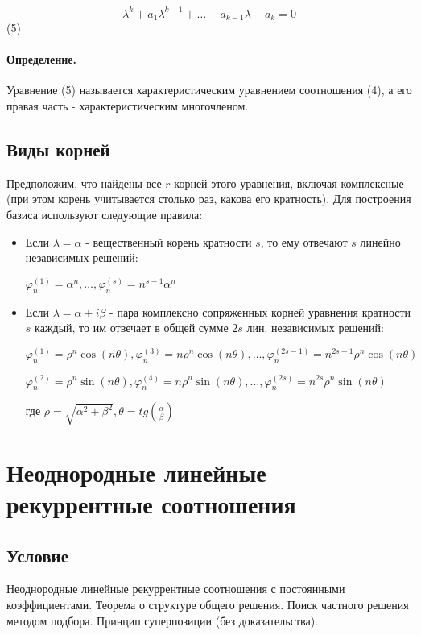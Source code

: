 \documentclass{report}
\begin{document}
$$\lambda^{k} + a_1\lambda^{k-1} + \ldots + a_{k-1}\lambda + a_{k} = 0 $$ (5)

\paragraph*{Определение.}
Уравнение (5) называется характеристическим уравнением соотношения (4), а его правая часть -
характеристическим многочленом.

\subsection{Виды корней}

Предположим, что найдены все $r$ корней этого уравнения, включая комплексные (при этом
корень учитывается столько раз, какова его кратность). Для построения базиса используют
следующие правила:

 \begin{itemize}
	 \item Если $\lambda = \alpha$ - вещественный корень кратности  $s$, то
		 ему отвечают  $s$ линейно независимых решений:

		 $\varphi^{(1)}_{n} = \alpha^{n}, \ldots,\varphi^{(s)}_{n} = n^{s-1}\alpha^{n}$ 
	\item Если $\lambda = \alpha \pm i\beta$ - пара комплексно сопряженных корней уравнения
		кратности  $s$ каждый, то им отвечает в общей сумме  $2s$ лин.
		независимых решений:

		$\varphi^{(1)}_{n} = \rho^{n}\cos(n\theta),\varphi^{(3)}_{n} = n\rho^{n}\cos(n\theta),
		\ldots,\varphi^{(2s-1)}_{n} = n^{2s-1}\rho^{n}\cos(n\theta)$ 


		$\varphi^{(2)}_{n} = \rho^{n}\sin(n\theta),\varphi^{(4)}_{n} = n\rho^{n}\sin(n\theta),
		\ldots,\varphi^{(2s)}_{n} = n^{2s}\rho^{n}\sin(n\theta)$

		где $\rho = \sqrt{\alpha^2+\beta^2} , \theta = tg(\frac{\alpha}{\beta})$
\end{itemize}

\newpage

\section{Неоднородные линейные рекуррентные соотношения}
\subsection{Условие}
Неоднородные линейные рекуррентные соотношения с постоянными
коэффициентами. Теорема о структуре общего решения. Поиск частного решения
методом подбора. Принцип суперпозиции (без доказательства).
\end{document}
